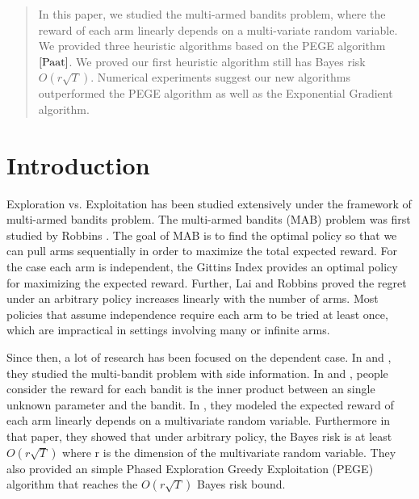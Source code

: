 \documentclass{article}
\theoremstyle{plain}
\theoremstyle{definition}
\begin{document}
 

\begin{abstract} 
In this paper, we studied the multi-armed bandits problem, where the reward of each arm linearly depends on a multi-variate random variable. We provided three heuristic algorithms based on the PEGE algorithm $\cite{Paat}$. We proved our first heuristic algorithm still has Bayes risk $O(r\sqrt{T})$. Numerical experiments suggest our new algorithms outperformed the PEGE algorithm as well as the Exponential Gradient algorithm. 
\end{abstract} 


\section{Introduction}

Exploration vs. Exploitation has been studied extensively under the framework of multi-armed bandits problem. The multi-armed bandits (MAB) problem was first studied by Robbins \cite{Robbins}. The goal of MAB is to find the optimal policy so that we can pull arms sequentially in order to maximize the total expected reward. For the case each arm is independent, the Gittins Index \cite{Gittins} provides an optimal policy for maximizing the expected reward. Further, Lai and Robbins \cite{Lai} proved the regret under an arbitrary policy increases linearly with the number of arms. Most policies that assume independence require each arm to be tried at least once, which are impractical in settings involving many or infinite arms. 

Since then, a lot of research has been focused on the dependent case. In \cite{Gabor} and \cite{Chih-Chun}, they studied the multi-bandit problem with side information. In \cite{Yasin1} and \cite{Yasin2}, people consider the reward for each bandit is the inner product between an single unknown parameter and the bandit. In \cite{Paat}, they modeled the expected reward of each arm linearly depends on a multivariate random variable. Furthermore in that paper, they showed that under arbitrary policy, the Bayes risk is at least $O(r\sqrt{T})$ where r is the dimension of the multivariate random variable. They also provided an simple Phased Exploration Greedy Exploitation (PEGE) algorithm that reaches the $O(r\sqrt{T})$ Bayes risk bound.
\end{document}
